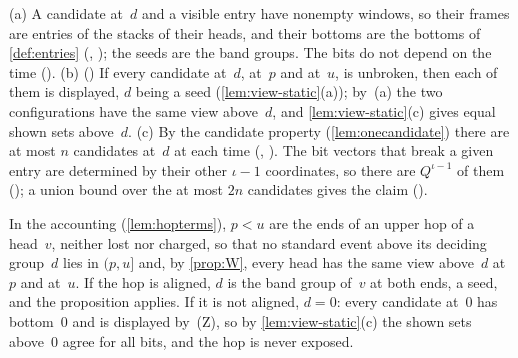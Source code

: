 \begin{outline}
(a) A candidate at~$d$ and a visible entry have nonempty windows, so their frames are entries of the stacks of their heads, and
their bottoms are the bottoms of \cref{def:entries} (, ); the seeds are the band
groups. The bits do not depend on the time (). (b) () If every candidate at~$d$, at~$p$ and
at~$u$, is unbroken, then each of them is displayed, $d$ being a seed (\cref{lem:view-static}(a)); by~(a) the two configurations
have the same view above~$d$, and \cref{lem:view-static}(c) gives equal shown sets above~$d$. (c) By the candidate property
(\cref{lem:onecandidate}) there are at most $n$ candidates at~$d$ at each time (, ). The bit
vectors that break a given entry are determined by their other $\iota-1$ coordinates, so there are $Q^{\iota-1}$ of them
(); a union bound over the at most $2n$ candidates gives the claim ().
\end{outline}

In the accounting (\cref{lem:hopterms}), $p<u$ are the ends of an upper hop of a head~$v$, neither lost nor charged, so that no
standard event above its deciding group~$d$ lies in $(p,u]$ and, by \cref{prop:W}, every head has the same view above~$d$ at~$p$
and at~$u$. If the hop is aligned, $d$ is the band group of~$v$ at both ends, a seed, and the proposition applies. If it is not
aligned, $d=0$: every candidate at~$0$ has bottom~$0$ and is displayed by~(Z), so by \cref{lem:view-static}(c) the shown sets
above~$0$ agree for all bits, and the hop is never exposed.
